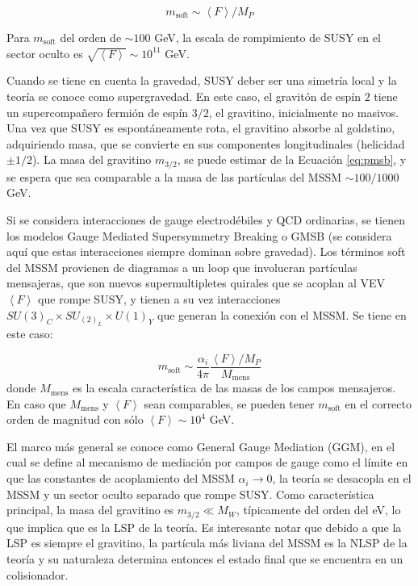 \begin{equation}
m_{\text{soft}} \sim \left< F \right>/M_P
\label{eq:pmsb}
\end{equation}

Para $m_{\text{soft}}$ del orden de $\sim 100$ GeV, la escala de rompimiento de SUSY en el sector oculto es $\sqrt{\left< F \right>}\sim 10^{11}$ GeV.

Cuando se tiene en cuenta la gravedad, SUSY deber ser una simetría local y la
teoría se conoce como supergravedad. En este caso, el gravitón de espín $2$ tiene un
supercompañero fermión de espín $3/2$, el gravitino, inicialmente no masivos. Una vez
que SUSY es espontáneamente rota, el gravitino absorbe al goldstino, adquiriendo
masa, que se convierte en sus componentes longitudinales (helicidad $\pm1/2$). La masa
del gravitino $m_{3/2}$, se puede estimar de la Ecuación \ref{eq:pmsb}, y se espera que sea comparable
a la masa de las partículas del MSSM $\sim100/1000$ GeV.

Si se considera interacciones de gauge electrodébiles y QCD ordinarias, se tienen
los modelos Gauge Mediated Supersymmetry Breaking o GMSB \cite{gmsb1, gmsb2, gmsb3} (se considera aquí que estas interacciones siempre dominan sobre gravedad). Los términos
soft del MSSM provienen de diagramas a un loop que involucran partículas mensajeras, que son nuevos supermultipletes quirales que se acoplan al VEV $\left< F \right>$ que
rompe SUSY, y tienen a su vez interacciones $SU(3)_C \times SU_(2)_L \times U(1)_Y$ que generan
la conexión con el MSSM. Se tiene en este caso:

\begin{equation}
m_{\text{soft}} \sim \frac{\alpha_i}{4\pi}\frac{\left< F \right>/M_P}{M_\text{mens}}
\label{eq:gmsb}
\end{equation}
%
donde $M_\text{mens}$ es la escala característica de las masas de los campos mensajeros. En
caso que $M_\text{mens}$ y $\left< F \right>$ sean comparables, se pueden tener $m_{\text{soft}}$ en el correcto
orden de magnitud con sólo $\left< F \right>\sim 10^4$ GeV.

El marco más general se conoce como General Gauge Mediation (GGM), en el
cual se define al mecanismo de mediación por campos de gauge como el límite en
que las constantes de acoplamiento del MSSM $\alpha_i\to 0$, la teoría se desacopla en el
MSSM y un sector oculto separado que rompe SUSY. Como característica principal, la masa del
gravitino es $m_{3/2} \ll M_W$, típicamente del orden del eV, lo que implica que es la LSP
de la teoría. Es interesante notar que debido a que la LSP es siempre el gravitino, la
partícula más liviana del MSSM es la NLSP de la teoría y su naturaleza determina
entonces el estado final que se encuentra en un colisionador.

